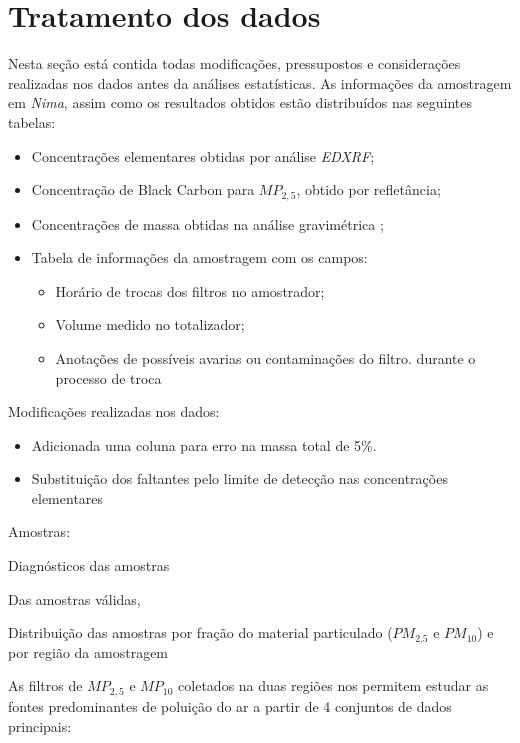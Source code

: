 \section{Tratamento dos dados}

Nesta seção está contida todas modificações, pressupostos e considerações 
realizadas nos dados antes da análises estatísticas.
As informações da amostragem em \textit{Nima}, assim como os resultados obtidos
estão distribuídos nas seguintes tabelas: 

\begin{itemize}
  \item Concentrações elementares obtidas por análise \textit{EDXRF};
  \item Concentração de Black Carbon para $MP_{2,5}$, obtido por refletância;
  \item Concentrações de massa obtidas na análise gravimétrica  ;
  \item Tabela de informações da amostragem com os campos:
  \begin{itemize}
    \item Horário de trocas dos filtros no amostrador;
    \item Volume medido no totalizador;
    \item Anotações de possíveis avarias ou contaminações do filtro.
          durante o processo de troca
  \end{itemize}
\end{itemize}

Modificações realizadas nos dados:
\begin{itemize}
\item Adicionada uma coluna para erro na massa total de 5\%.
\item Substituição dos faltantes pelo limite de detecção nas 
      concentrações elementares
\end{itemize}

Amostras:
\begin{table}[H]
  \centering
  
  \caption{Diagnósticos das amostras}
\end{table}

Das amostras válidas, 
\begin{table}[H]
  \centering
  
  \caption{Distribuição das amostras por fração do material particulado 
  ($PM_{2.5}$ e $PM_{10}$) e por região da amostragem}
\end{table}

As filtros de $MP_{2,5}$ e $MP_{10}$ coletados na duas regiões nos permitem 
estudar as fontes predominantes de poluição do ar a partir de 4 
conjuntos de dados principais: 

